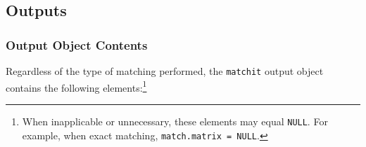 \documentclass[oneside,letterpaper,titlepage]{article}
\begin{document}

\subsection{Outputs}
\label{subsec:outputs}

\subsubsection{Output Object Contents}

Regardless of the type of matching performed, the \texttt{matchit}
output object contains the following elements:\footnote{When
inapplicable or unnecessary, these elements may equal {\tt NULL}.  For
example, when exact matching, {\tt match.matrix = NULL}.}
\end{document}

